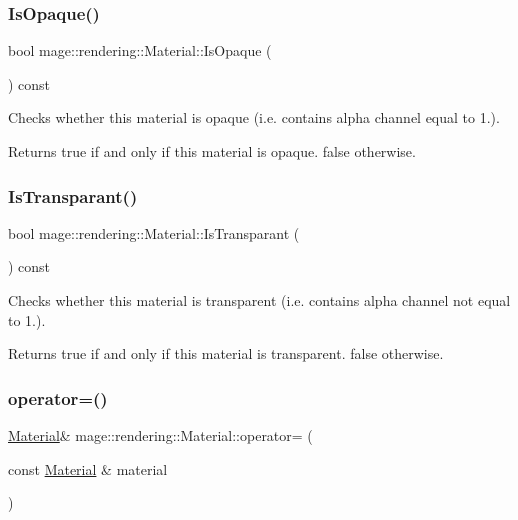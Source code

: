 \subsubsection{\texorpdfstring{Is\+Opaque()}{IsOpaque()}}
{\footnotesize\ttfamily bool mage\+::rendering\+::\+Material\+::\+Is\+Opaque (\begin{DoxyParamCaption}{ }\end{DoxyParamCaption}) const\hspace{0.3cm}{\ttfamily [noexcept]}}

Checks whether this material is opaque (i.\+e. contains alpha channel equal to 1.).

\begin{DoxyReturn}{Returns}
{\ttfamily true} if and only if this material is opaque. {\ttfamily false} otherwise. 
\end{DoxyReturn}
\hypertarget{classmage_1_1rendering_1_1_material_ae60d1b61ebd38d3e329a519b2f2c3dad}{}\label{classmage_1_1rendering_1_1_material_ae60d1b61ebd38d3e329a519b2f2c3dad} 
\subsubsection{\texorpdfstring{Is\+Transparant()}{IsTransparant()}}
{\footnotesize\ttfamily bool mage\+::rendering\+::\+Material\+::\+Is\+Transparant (\begin{DoxyParamCaption}{ }\end{DoxyParamCaption}) const\hspace{0.3cm}{\ttfamily [noexcept]}}

Checks whether this material is transparent (i.\+e. contains alpha channel not equal to 1.).

\begin{DoxyReturn}{Returns}
{\ttfamily true} if and only if this material is transparent. {\ttfamily false} otherwise. 
\end{DoxyReturn}
\hypertarget{classmage_1_1rendering_1_1_material_a535022bb3c1264412278337fc3d5d717}{}\label{classmage_1_1rendering_1_1_material_a535022bb3c1264412278337fc3d5d717} 
\subsubsection{\texorpdfstring{operator=()}{operator=()}\hspace{0.1cm}{\footnotesize\ttfamily [1/2]}}
{\footnotesize\ttfamily \hyperlink{classmage_1_1rendering_1_1_material}{Material}\& mage\+::rendering\+::\+Material\+::operator= (\begin{DoxyParamCaption}\item[{const \hyperlink{classmage_1_1rendering_1_1_material}{Material} \&}]{material }\end{DoxyParamCaption})\hspace{0.3cm}{\ttfamily [default]}}

